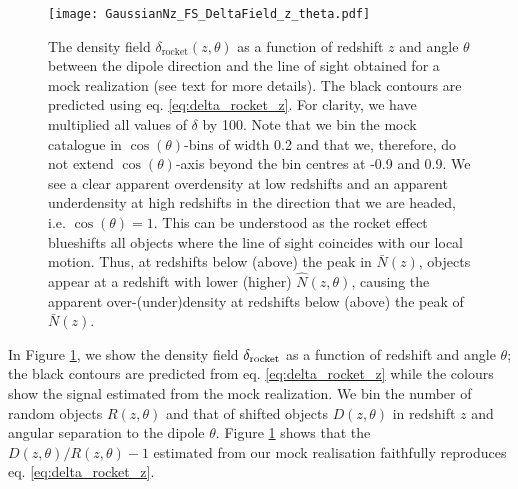 \documentclass[a4paper,11pt]{article}
\begin{document}
\begin{figure}[!h]
    \centering
    \texttt{[image: GaussianNz\_FS\_DeltaField\_z\_theta.pdf]}
    \caption{The density field $\delta_\mathrm{rocket}(z,\theta)$ as a function of redshift $z$ and angle $\theta$ between the dipole direction and the line of sight obtained for a mock realization (see text for more details). The black contours are predicted using eq. \eqref{eq:delta_rocket_z}. For clarity, we have multiplied all values of $\delta$ by 100. Note that we bin the mock catalogue in $\cos(\theta)$-bins of width 0.2 and that we, therefore, do not extend $\cos(\theta)$-axis beyond the bin centres at -0.9 and 0.9. We see a clear apparent overdensity at low redshifts and an apparent underdensity at high redshifts in the direction that we are headed, i.e. $\cos(\theta) = 1$. This can be understood as the rocket effect blueshifts all objects where the line of sight coincides with our local motion. Thus, at redshifts below (above) the peak in $\bar N(z)$, objects appear at a redshift with lower (higher) $\hat N(z, \theta)$, causing the apparent over-(under)density at redshifts below (above) the peak of $\bar N(z)$.}
    \label{fig:delta_z_theta}
\end{figure}




In Figure \ref{fig:delta_z_theta}, we show the density field $\delta_{\rm rocket}$ as a function of redshift and angle $\theta$;  the black contours are predicted from eq. \eqref{eq:delta_rocket_z} while the colours show the signal estimated from the mock realization.  We bin the number of random objects $R(z, \theta)$ and that of shifted objects $D(z, \theta)$ in redshift $z$ and angular separation to the dipole $\theta$. Figure \ref{fig:delta_z_theta} shows  that the $D(z,\theta)/R(z,\theta)-1$ estimated from our mock realisation faithfully reproduces eq. \eqref{eq:delta_rocket_z}.
\end{document}
